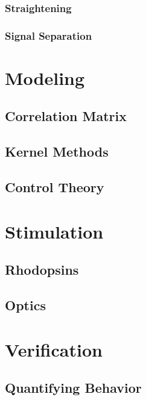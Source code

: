 \documentclass[letter,11pt]{article}
\begin{document}
\subsubsection{Straightening}

\subsubsection{Signal Separation}



\section{Modeling}

\subsection{Correlation Matrix}

\subsection{Kernel Methods}


\subsection{Control Theory}



\section{Stimulation}

\subsection{Rhodopsins}

\subsection{Optics}



\section{Verification}

\subsection{Quantifying Behavior}
\end{document}
